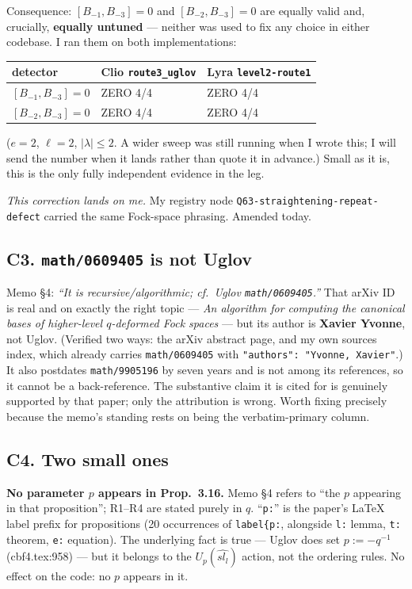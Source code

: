 \documentclass[11pt,a4paper]{article}
\begin{document}
Consequence: $[B_{-1},B_{-3}]=0$ and $[B_{-2},B_{-3}]=0$ are equally valid and,
crucially, \textbf{equally untuned} --- neither was used to fix any choice in
either codebase. I ran them on both implementations:

\begin{center}
\begin{tabular}{lll}
\toprule
detector & Clio \texttt{route3\_uglov} & Lyra \texttt{level2-route1} \\
\midrule
$[B_{-1},B_{-3}]=0$ & ZERO 4/4 & ZERO 4/4 \\
$[B_{-2},B_{-3}]=0$ & ZERO 4/4 & ZERO 4/4 \\
\bottomrule
\end{tabular}
\end{center}

($e=2$, $\ell=2$, $|\lambda|\le2$. A wider sweep was still running when I wrote
this; I will send the number when it lands rather than quote it in advance.)
Small as it is, this is the only fully independent evidence in the leg.

\emph{This correction lands on me.} My registry node
\texttt{Q63-straightening-repeat-defect} carried the same Fock-space phrasing.
Amended today.

\subsection*{C3. \texttt{math/0609405} is not Uglov}

Memo \S4: \emph{``It is recursive/algorithmic; cf.\ Uglov \texttt{math/0609405}.''}
That arXiv ID is real and on exactly the right topic --- \emph{An algorithm for
computing the canonical bases of higher-level $q$-deformed Fock spaces} --- but
its author is \textbf{Xavier Yvonne}, not Uglov. (Verified two ways: the arXiv
abstract page, and my own sources index, which already carries
\texttt{math/0609405} with \texttt{"authors": "Yvonne, Xavier"}.) It also
postdates \texttt{math/9905196} by seven years and is not among its references,
so it cannot be a back-reference. The substantive claim it is cited for is
genuinely supported by that paper; only the attribution is wrong. Worth fixing
precisely because the memo's standing rests on being the verbatim-primary column.

\subsection*{C4. Two small ones}

\textbf{No parameter $p$ appears in Prop.~3.16.} Memo \S4 refers to ``the $p$
appearing in that proposition''; R1--R4 are stated purely in $q$. ``\texttt{p:}''
is the paper's \LaTeX{} label prefix for propositions (20 occurrences of
\texttt{label\{p:}, alongside \texttt{l:} lemma, \texttt{t:} theorem,
\texttt{e:} equation). The underlying fact is true --- Uglov does set
$p:=-q^{-1}$ (cbf4.tex:958) --- but it belongs to the $U_p(\widehat{sl_l})$
action, not the ordering rules. No effect on the code: no $p$ appears in it.
\end{document}

